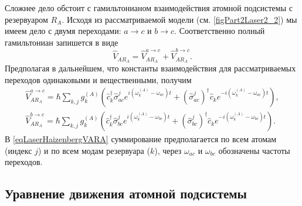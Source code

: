 Сложнее дело обстоит с гамильтонианом взаимодействия атомной
подсистемы с резервуаром $R_A$. Исходя из рассматриваемой модели
(см. \autoref{figPart2Laser2_2}) мы имеем дело с двумя переходами:
$a \rightarrow c$ и $b \rightarrow c$. Соответственно полный
гамильтониан запишется в виде
\begin{equation}
\hat{V}_{AR_A} = \hat{V}_{AR_A}^{a \rightarrow c} + \hat{V}_{AR_A}^{b \rightarrow c}.
\nonumber
\end{equation}
Предполагая в дальнейшем, что константы взаимодействия для
рассматриваемых переходов одинаковыми и вещественными, получим
\begin{eqnarray}
\hat{V}_{AR_A}^{a \rightarrow c} = \hbar \sum_{k,j} 
g_k^{(A)}
 \left(
\hat{c}_k^{\dag}\hat{\sigma}_{ac}^{j} e^{i\left(\omega_k^{(A)} - \omega_{ac}\right)t} +
\left(\hat{\sigma}_{ac}^{j}\right)^{\dag}\hat{c}_k e^{-i\left(\omega_k^{(A)} - \omega_{ac}\right)t}
\right),
\nonumber \\
\hat{V}_{AR_A}^{b \rightarrow c} = \hbar \sum_{k,j} 
g_k^{(A)}
 \left(
\hat{c}_k^{\dag}\hat{\sigma}_{bc}^{j} e^{i\left(\omega_k^{(A)} - \omega_{bc}\right)t} +
\left(\hat{\sigma}_{bc}^{j}\right)^{\dag}\hat{c}_k e^{-i\left(\omega_k^{(A)} - \omega_{bc}\right)t}
\right).
\label{eqLaserHaizenbergVARA}
\end{eqnarray}
В \eqref{eqLaserHaizenbergVARA} суммирование предполагается по всем
атомам (индекс $j$) и по всем модам резервуара ($k$), через
$\omega_{ac}$ и $\omega_{bc}$ обозначены частоты переходов.

\subsection{Уравнение движения атомной подсистемы}

